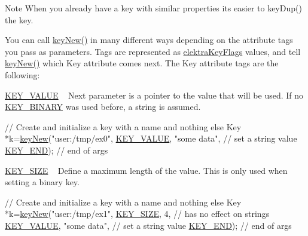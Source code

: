 \begin{DoxyNote}{Note}
When you already have a key with similar properties its easier to key\+Dup() the key.
\end{DoxyNote}
You can call \hyperlink{group__key_gad23c65b44bf48d773759e1f9a4d43b89}{key\+New()} in many different ways depending on the attribute tags you pass as parameters. Tags are represented as \hyperlink{group__key_ga9b703ca49f48b482def322b77d3e6bc8}{elektra\+Key\+Flags} values, and tell \hyperlink{group__key_gad23c65b44bf48d773759e1f9a4d43b89}{key\+New()} which Key attribute comes next. The Key attribute tags are the following\+:
\begin{DoxyItemize}
\item \hyperlink{group__key_gga9b703ca49f48b482def322b77d3e6bc8ac66e4a49d09212b79f5754ca6db5bd2e}{K\+E\+Y\+\_\+\+V\+A\+L\+UE} ~\newline
 Next parameter is a pointer to the value that will be used. If no \hyperlink{group__key_gga9b703ca49f48b482def322b77d3e6bc8a1ca18d4e094ae7487d35ecedda2235ff}{K\+E\+Y\+\_\+\+B\+I\+N\+A\+RY} was used before, a string is assumed. 
\begin{DoxyCodeInclude}
\textcolor{comment}{// Create and initialize a key with a name and nothing else}
Key *k=\hyperlink{group__key_gad23c65b44bf48d773759e1f9a4d43b89}{keyNew}(\textcolor{stringliteral}{"user:/tmp/ex0"},
        \hyperlink{group__key_gga9b703ca49f48b482def322b77d3e6bc8ac66e4a49d09212b79f5754ca6db5bd2e}{KEY\_VALUE}, \textcolor{stringliteral}{"some data"},    \textcolor{comment}{// set a string value}
        \hyperlink{group__key_gga9b703ca49f48b482def322b77d3e6bc8aa8adb6fcb92dec58fb19410eacfdd403}{KEY\_END});                  \textcolor{comment}{// end of args}
\end{DoxyCodeInclude}

\item \hyperlink{group__key_gga9b703ca49f48b482def322b77d3e6bc8a6d531b5c41445d19d0452eebdccbfa01}{K\+E\+Y\+\_\+\+S\+I\+ZE} ~\newline
 Define a maximum length of the value. This is only used when setting a binary key. 
\begin{DoxyCodeInclude}
\textcolor{comment}{// Create and initialize a key with a name and nothing else}
Key *k=\hyperlink{group__key_gad23c65b44bf48d773759e1f9a4d43b89}{keyNew}(\textcolor{stringliteral}{"user:/tmp/ex1"},
        \hyperlink{group__key_gga9b703ca49f48b482def322b77d3e6bc8a6d531b5c41445d19d0452eebdccbfa01}{KEY\_SIZE}, 4,               \textcolor{comment}{// has no effect on strings}
        \hyperlink{group__key_gga9b703ca49f48b482def322b77d3e6bc8ac66e4a49d09212b79f5754ca6db5bd2e}{KEY\_VALUE}, \textcolor{stringliteral}{"some data"},    \textcolor{comment}{// set a string value}
        \hyperlink{group__key_gga9b703ca49f48b482def322b77d3e6bc8aa8adb6fcb92dec58fb19410eacfdd403}{KEY\_END});                  \textcolor{comment}{// end of args}
\end{DoxyCodeInclude}


\end{DoxyItemize}
